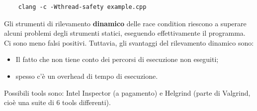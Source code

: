 \begin{lstlisting}
    clang -c -Wthread-safety example.cpp
\end{lstlisting}

Gli strumenti di rilevamento \textbf{dinamico} delle race condition riescono a superare alcuni
problemi degli strumenti statici, eseguendo effettivamente il programma.
Ci sono meno falsi positivi. Tuttavia, gli svantaggi del rilevamento dinamico sono:

\begin{itemize}
    \item Il fatto che non tiene conto dei percorsi di esecuzione non eseguiti;
    \item spesso c'è un overhead di tempo di esecuzione.
\end{itemize}

Possibili tools sono: Intel Inspector (a pagamento) e Helgrind
(parte di Valgrind, cioè una suite di 6 tools differenti).
